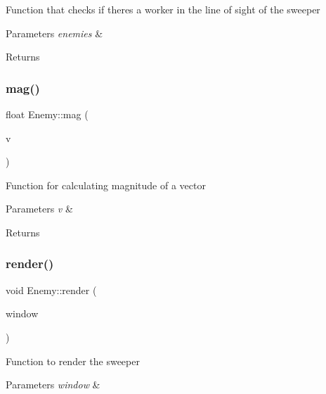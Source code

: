 Function that checks if theres a worker in the line of sight of the sweeper 


\begin{DoxyParams}{Parameters}
{\em enemies} & \\
\hline
\end{DoxyParams}
\begin{DoxyReturn}{Returns}

\end{DoxyReturn}
\mbox{\label{class_enemy_a5208f54e3db5885caef976f25802f938}} 
\subsubsection{\texorpdfstring{mag()}{mag()}}
{\footnotesize\ttfamily float Enemy\+::mag (\begin{DoxyParamCaption}\item[{sf\+::\+Vector2f}]{v }\end{DoxyParamCaption})}



Function for calculating magnitude of a vector 


\begin{DoxyParams}{Parameters}
{\em v} & \\
\hline
\end{DoxyParams}
\begin{DoxyReturn}{Returns}

\end{DoxyReturn}
\mbox{\label{class_enemy_adce121a5d559e9d666d7f88c7a26dc1f}} 
\subsubsection{\texorpdfstring{render()}{render()}}
{\footnotesize\ttfamily void Enemy\+::render (\begin{DoxyParamCaption}\item[{sf\+::\+Render\+Window \&}]{window }\end{DoxyParamCaption})}



Function to render the sweeper 


\begin{DoxyParams}{Parameters}
{\em window} & \\
\hline
\end{DoxyParams}
\mbox{\label{class_enemy_a5bd77160e8d13c04b4bf4dae537ada9e}} 
